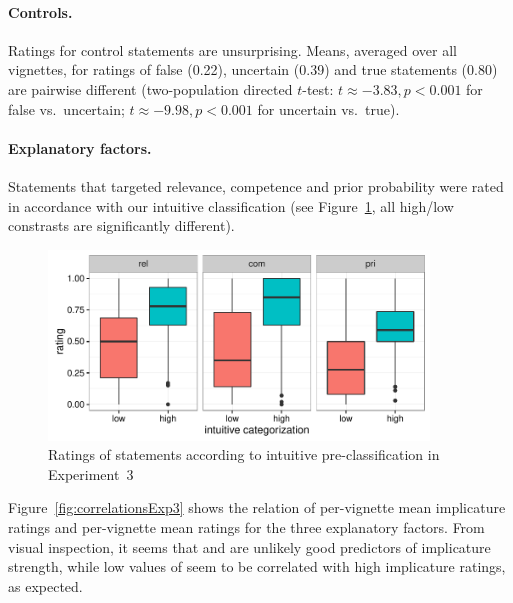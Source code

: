 \documentclass[12pt]{article}
\begin{document}
\paragraph{Controls.} Ratings for control statements are unsurprising. Means, averaged over all
vignettes, for ratings of false (0.22), uncertain (0.39) and true statements (0.80) are
pairwise different (two-population directed $t$-test: $t \approx - 3.83, p < 0.001$ for false
vs.~uncertain; $t \approx - 9.98, p < 0.001$ for uncertain vs.~true).

\paragraph{Explanatory factors.} Statements that targeted relevance, competence and prior
probability were rated in accordance with our intuitive classification (see
Figure~\ref{fig:factorBoxPlotsExp3}, all high/low constrasts are significantly different).

\begin{figure}
  \centering

  \includegraphics[width = 0.9\textwidth]{pics/factorBoxPlotExp3.pdf}
  
  \caption{Ratings of statements according to intuitive pre-classification in Experiment~3}
  \label{fig:factorBoxPlotsExp3}
\end{figure}

Figure~\ref{fig:correlationsExp3} shows the relation of per-vignette mean implicature ratings
and per-vignette mean ratings for the three explanatory factors. From visual inspection, it
seems that \rel and \com are unlikely good predictors of implicature strength, while low values
of \pri seem to be correlated with high implicature ratings, as expected.
\end{document}
